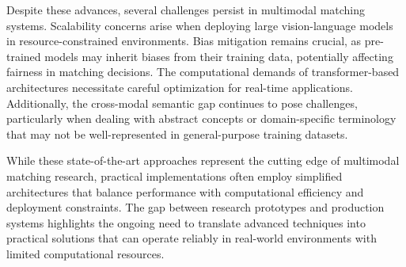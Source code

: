 Despite these advances, several challenges persist in multimodal matching systems. Scalability concerns arise when deploying large vision-language models in resource-constrained environments. Bias mitigation remains crucial, as pre-trained models may inherit biases from their training data, potentially affecting fairness in matching decisions. The computational demands of transformer-based architectures necessitate careful optimization for real-time applications. Additionally, the cross-modal semantic gap continues to pose challenges, particularly when dealing with abstract concepts or domain-specific terminology that may not be well-represented in general-purpose training datasets.

While these state-of-the-art approaches represent the cutting edge of multimodal matching research, practical implementations often employ simplified architectures that balance performance with computational efficiency and deployment constraints. The gap between research prototypes and production systems highlights the ongoing need to translate advanced techniques into practical solutions that can operate reliably in real-world environments with limited computational resources.